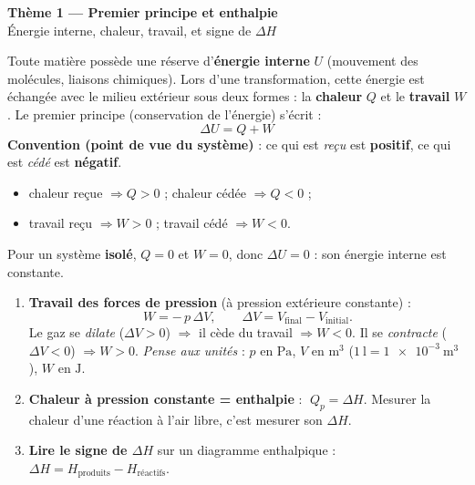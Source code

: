 \documentclass[11pt,a4paper]{article}
\begin{document}
\begin{center}
{\Large\bfseries\color{primarydark} Thème 1 — Premier principe et enthalpie}\\[2pt]
{\color{primary}\small Énergie interne, chaleur, travail, et signe de $\Delta H$}
\end{center}

\begin{cle}
Toute matière possède une réserve d'\textbf{énergie interne} $U$ (mouvement des molécules, liaisons chimiques). Lors d'une transformation, cette énergie est échangée avec le milieu extérieur sous deux formes : la \textbf{chaleur} $Q$ et le \textbf{travail} $W$. Le premier principe (conservation de l'énergie) s'écrit :
\[ \boxed{\;\Delta U = Q + W\;} \]
\textbf{Convention (point de vue du système)} : ce qui est \emph{reçu} est \textbf{positif}, ce qui est \emph{cédé} est \textbf{négatif}.
\begin{itemize}[leftmargin=1.6em,topsep=2pt,itemsep=1pt]
  \item chaleur reçue $\Rightarrow Q>0$ ; chaleur cédée $\Rightarrow Q<0$ ;
  \item travail reçu $\Rightarrow W>0$ ; travail cédé $\Rightarrow W<0$.
\end{itemize}
Pour un système \textbf{isolé}, $Q=0$ et $W=0$, donc $\Delta U = 0$ : son énergie interne est constante.
\end{cle}

\begin{methode}
\begin{enumerate}[label=\arabic*.,leftmargin=1.8em,topsep=2pt,itemsep=2pt]
  \item \textbf{Travail des forces de pression} (à pression extérieure constante) :
  \[ W = -\,p\,\Delta V,\qquad \Delta V = V_{\text{final}}-V_{\text{initial}}. \]
  Le gaz se \emph{dilate} ($\Delta V>0$) $\Rightarrow$ il cède du travail $\Rightarrow W<0$. Il se \emph{contracte} ($\Delta V<0$) $\Rightarrow W>0$. \emph{Pense aux unités} : $p$ en $\si{\pascal}$, $V$ en $\si{\cubic\metre}$ (\;$\qty{1}{\litre}=\qty{1e-3}{\cubic\metre}$\;), $W$ en $\si{\joule}$.
  \item \textbf{Chaleur à pression constante = enthalpie} : $\;Q_p = \Delta H$. Mesurer la chaleur d'une réaction à l'air libre, c'est mesurer son $\Delta H$.
  \item \textbf{Lire le signe de $\Delta H$} sur un diagramme enthalpique : $\Delta H = H_{\text{produits}} - H_{\text{réactifs}}$.
\end{enumerate}
\end{methode}
\end{document}
